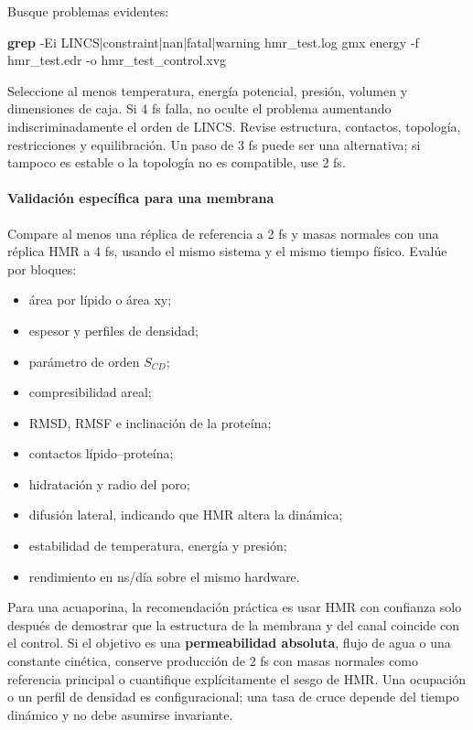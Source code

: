 \documentclass[
  spanish,
  11pt,
  a4paper]{article}
\newenvironment{Shaded}{\begin{snugshade}}{\end{snugshade}}
\newcommand{\AttributeTok}[1]{\textcolor[rgb]{0.13,0.29,0.53}{#1}}
\newcommand{\ExtensionTok}[1]{#1}
\newcommand{\FunctionTok}[1]{\textcolor[rgb]{0.13,0.29,0.53}{\textbf{#1}}}
\newcommand{\NormalTok}[1]{#1}
\newcommand{\StringTok}[1]{\textcolor[rgb]{0.31,0.60,0.02}{#1}}
\providecommand{\tightlist}{%
  \setlength{\itemsep}{0pt}\setlength{\parskip}{0pt}}
\begin{document}
Busque problemas evidentes:

\begin{Shaded}
\begin{Highlighting}[]
\FunctionTok{grep} \AttributeTok{{-}Ei} \StringTok{\textquotesingle{}LINCS|constraint|nan|fatal|warning\textquotesingle{}}\NormalTok{ hmr\_test.log}
\ExtensionTok{gmx}\NormalTok{ energy }\AttributeTok{{-}f}\NormalTok{ hmr\_test.edr }\AttributeTok{{-}o}\NormalTok{ hmr\_test\_control.xvg}
\end{Highlighting}
\end{Shaded}

Seleccione al menos temperatura, energía potencial, presión, volumen y
dimensiones de caja. Si 4 fs falla, no oculte el problema aumentando
indiscriminadamente el orden de LINCS. Revise estructura, contactos,
topología, restricciones y equilibración. Un paso de 3 fs puede ser una
alternativa; si tampoco es estable o la topología no es compatible, use
2 fs.

\paragraph{Validación específica para una
membrana}\label{validaciuxf3n-especuxedfica-para-una-membrana}

Compare al menos una réplica de referencia a 2 fs y masas normales con
una réplica HMR a 4 fs, usando el mismo sistema y el mismo tiempo
físico. Evalúe por bloques:

\begin{itemize}
\tightlist
\item
  área por lípido o área xy;
\item
  espesor y perfiles de densidad;
\item
  parámetro de orden \(S_{CD}\);
\item
  compresibilidad areal;
\item
  RMSD, RMSF e inclinación de la proteína;
\item
  contactos lípido--proteína;
\item
  hidratación y radio del poro;
\item
  difusión lateral, indicando que HMR altera la dinámica;
\item
  estabilidad de temperatura, energía y presión;
\item
  rendimiento en ns/día sobre el mismo hardware.
\end{itemize}

Para una acuaporina, la recomendación práctica es usar HMR con confianza
solo después de demostrar que la estructura de la membrana y del canal
coincide con el control. Si el objetivo es una \textbf{permeabilidad
absoluta}, flujo de agua o una constante cinética, conserve producción
de 2 fs con masas normales como referencia principal o cuantifique
explícitamente el sesgo de HMR. Una ocupación o un perfil de densidad es
configuracional; una tasa de cruce depende del tiempo dinámico y no debe
asumirse invariante.
\end{document}
